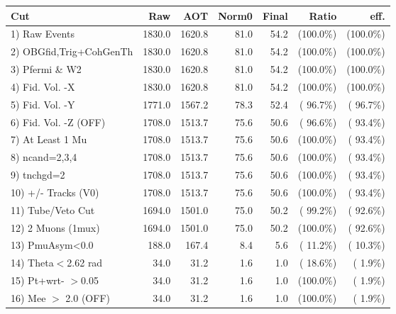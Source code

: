 \begin{table}[h!]\centering
 \begin{tabular}{||l||r|r|r|r|r|r||}
 \hline
 \hline
 Cut & Raw & AOT & Norm0 & Final & Ratio & eff.       \\
 \hline
  1) Raw Events           &       1830.0 &       1620.8 &         81.0 &         54.2 & (100.0\%) & (100.0\%) \\
  2) OBGfid,Trig+CohGenTh &       1830.0 &       1620.8 &         81.0 &         54.2 & (100.0\%) & (100.0\%) \\
  3) Pfermi \& W2         &       1830.0 &       1620.8 &         81.0 &         54.2 & (100.0\%) & (100.0\%) \\
  4) Fid. Vol. -X         &       1830.0 &       1620.8 &         81.0 &         54.2 & (100.0\%) & (100.0\%) \\
  5) Fid. Vol. -Y         &       1771.0 &       1567.2 &         78.3 &         52.4 & ( 96.7\%) & ( 96.7\%) \\
  6) Fid. Vol. -Z (OFF)   &       1708.0 &       1513.7 &         75.6 &         50.6 & ( 96.6\%) & ( 93.4\%) \\
  7) At Least 1 Mu        &       1708.0 &       1513.7 &         75.6 &         50.6 & (100.0\%) & ( 93.4\%) \\
  8) ncand=2,3,4          &       1708.0 &       1513.7 &         75.6 &         50.6 & (100.0\%) & ( 93.4\%) \\
  9) tnchgd=2             &       1708.0 &       1513.7 &         75.6 &         50.6 & (100.0\%) & ( 93.4\%) \\
 10) +/- Tracks (V0)      &       1708.0 &       1513.7 &         75.6 &         50.6 & (100.0\%) & ( 93.4\%) \\
 11) Tube/Veto Cut        &       1694.0 &       1501.0 &         75.0 &         50.2 & ( 99.2\%) & ( 92.6\%) \\
 12) 2 Muons (1mux)       &       1694.0 &       1501.0 &         75.0 &         50.2 & (100.0\%) & ( 92.6\%) \\
 13) PmuAsym<0.0          &        188.0 &        167.4 &          8.4 &          5.6 & ( 11.2\%) & ( 10.3\%) \\
 14) Theta$<$2.62 rad     &         34.0 &         31.2 &          1.6 &          1.0 & ( 18.6\%) & (  1.9\%) \\
 15) Pt+wrt- $>$0.05      &         34.0 &         31.2 &          1.6 &          1.0 & (100.0\%) & (  1.9\%) \\
 16) Mee $>$ 2.0  (OFF)   &         34.0 &         31.2 &          1.6 &          1.0 & (100.0\%) & (  1.9\%) \\

\end{tabular}
\end{table}
